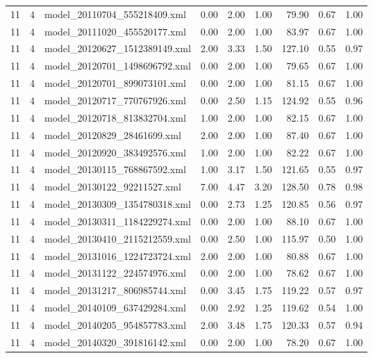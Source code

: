 \begin{table}[ht]
\begin{tabular}{rrlrrrrrr}
   11 &   4 & model\_20110704\_555218409.xml & 0.00 & 2.00 & 1.00 & 79.90 & 0.67 & 1.00 \\ 
   11 &   4 & model\_20111020\_455520177.xml & 0.00 & 2.00 & 1.00 & 83.97 & 0.67 & 1.00 \\ 
   11 &   4 & model\_20120627\_1512389149.xml & 2.00 & 3.33 & 1.50 & 127.10 & 0.55 & 0.97 \\ 
   11 &   4 & model\_20120701\_1498696792.xml & 0.00 & 2.00 & 1.00 & 79.65 & 0.67 & 1.00 \\ 
   11 &   4 & model\_20120701\_899073101.xml & 0.00 & 2.00 & 1.00 & 81.15 & 0.67 & 1.00 \\ 
   11 &   4 & model\_20120717\_770767926.xml & 0.00 & 2.50 & 1.15 & 124.92 & 0.55 & 0.96 \\ 
   11 &   4 & model\_20120718\_813832704.xml & 1.00 & 2.00 & 1.00 & 82.15 & 0.67 & 1.00 \\ 
   11 &   4 & model\_20120829\_28461699.xml & 2.00 & 2.00 & 1.00 & 87.40 & 0.67 & 1.00 \\ 
   11 &   4 & model\_20120920\_383492576.xml & 1.00 & 2.00 & 1.00 & 82.22 & 0.67 & 1.00 \\ 
   11 &   4 & model\_20130115\_768867592.xml & 1.00 & 3.17 & 1.50 & 121.65 & 0.55 & 0.97 \\ 
   11 &   4 & model\_20130122\_92211527.xml & 7.00 & 4.47 & 3.20 & 128.50 & 0.78 & 0.98 \\ 
   11 &   4 & model\_20130309\_1354780318.xml & 0.00 & 2.73 & 1.25 & 120.85 & 0.56 & 0.97 \\ 
   11 &   4 & model\_20130311\_1184229274.xml & 0.00 & 2.00 & 1.00 & 88.10 & 0.67 & 1.00 \\ 
   11 &   4 & model\_20130410\_2115212559.xml & 0.00 & 2.50 & 1.00 & 115.97 & 0.50 & 1.00 \\ 
   11 &   4 & model\_20131016\_1224723724.xml & 2.00 & 2.00 & 1.00 & 80.88 & 0.67 & 1.00 \\ 
   11 &   4 & model\_20131122\_224574976.xml & 0.00 & 2.00 & 1.00 & 78.62 & 0.67 & 1.00 \\ 
   11 &   4 & model\_20131217\_806985744.xml & 0.00 & 3.45 & 1.75 & 119.22 & 0.57 & 0.97 \\ 
   11 &   4 & model\_20140109\_637429284.xml & 0.00 & 2.92 & 1.25 & 119.62 & 0.54 & 1.00 \\ 
   11 &   4 & model\_20140205\_954857783.xml & 2.00 & 3.48 & 1.75 & 120.33 & 0.57 & 0.94 \\ 
   11 &   4 & model\_20140320\_391816142.xml & 0.00 & 2.00 & 1.00 & 78.20 & 0.67 & 1.00 \\ 

\end{tabular}
\end{table}
